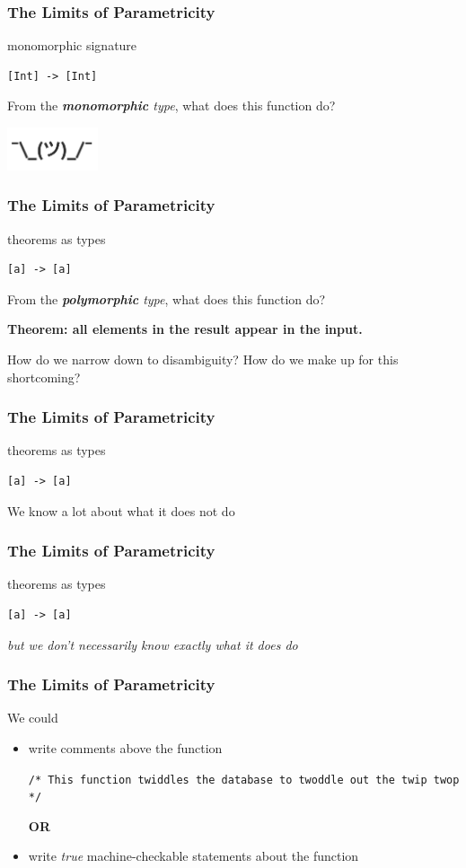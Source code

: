 \begin{frame}[fragile]
\frametitle{The Limits of Parametricity}
\begin{block}{monomorphic signature}
\begin{lstlisting}[style=haskell]
[Int] -> [Int]
\end{lstlisting}
From the \emph{\textbf{monomorphic} type}, what does this function do?
\end{block}
\includegraphics[width=0.2\textwidth]{image/shrug.png}
\end{frame}

\begin{frame}[fragile]
\frametitle{The Limits of Parametricity}
\begin{block}{theorems as types}
\begin{lstlisting}[style=csharp]
[a] -> [a]
\end{lstlisting}
From the \emph{\textbf{polymorphic} type}, what does this function do?
\end{block}
\large{\textbf{Theorem: all elements in the result appear in the input.}}

\tiny{How do we narrow down to disambiguity? How do we make up for this shortcoming?}
\end{frame}

\begin{frame}[fragile]
\frametitle{The Limits of Parametricity}
\begin{block}{theorems as types}
\begin{lstlisting}[style=csharp]
[a] -> [a]
\end{lstlisting}
\end{block}
We know a lot about what it does not do
\end{frame}

\begin{frame}[fragile]
\frametitle{The Limits of Parametricity}
\begin{block}{theorems as types}
\begin{lstlisting}[style=csharp]
[a] -> [a]
\end{lstlisting}
\end{block}
\emph{but we don't necessarily know exactly what it does do}
\end{frame}

\begin{frame}[fragile]
\frametitle{The Limits of Parametricity}
\begin{block}{We could}
\begin{itemize}
  \item<1-> write comments above the function

            \lstinline[style=csharp]{/* This function twiddles the database to twoddle out the twip twop */}

            \textbf{OR}
  \item<2-> write \emph{true} machine-checkable statements about the function
\end{itemize}
\end{block}
\end{frame}

